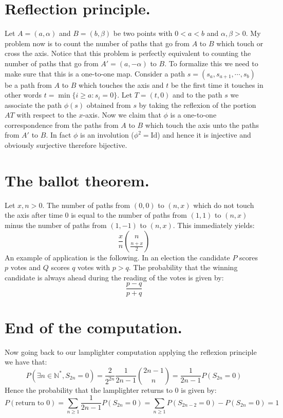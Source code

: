 \documentclass[10pt,a4paper]{book}
\theoremstyle{definition}
\begin{document}
\section{Reflection principle.} Let $A = (a, \alpha)$ and $B = (b, \beta)$ be two points with $0 < a < b$ and $\alpha, \beta > 0$. My problem now is to count the number of paths that go from $A$ to $B$ which touch or cross the axis. Notice that this problem is perfectly equivalent to counting the number of paths that go from $A' = (a, -\alpha)$ to $B$. To formalize this we need to make sure that this is a one-to-one map. Consider a path $s = (s_a, s_{a+1}, \cdots, s_b)$ be a path from $A$ to $B$ which touches the axis and $t$ be the first time it touches in other words $t = \min\{ i \geq a : s_i = 0\}$. Let $T = (t, 0)$ and to the path $s$ we associate the path $\phi(s)$ obtained from $s$ by taking the reflexion of the portion $AT$ with respect to the $x$-axis. Now we claim that $\phi$ is a one-to-one correspondence from the paths from $A$ to $B$ which touch the axis unto the paths from $A'$ to $B$. In fact $\phi$ is an involution ($\phi^2 = \text{Id}$) and hence it is injective and obviously surjective therefore bijective. 

\section{The ballot theorem.} Let $x, n > 0$. The number of paths from $(0,0)$ to $(n, x)$ which do not touch the axis after time $0$ is equal to the number of paths from $(1, 1)$ to $(n,x)$ minus the number of paths from $(1, -1)$ to $(n, x)$. This immediately yields:
\[
\frac{x}{n}\binom{n}{\frac{n+x}{2}}
\]  
An example of application is the following. In an election the candidate $P$ scores $p$ votes and $Q$ scores $q$ votes with $p > q$. The probability that the winning candidate is always ahead during the reading of the votes is given by:
\[
\frac{p - q}{p + q}
\]

\section{End of the computation.}
Now going back to our lamplighter computation applying the reflexion principle we have that:
\[
P(\exists n \in \mathbb{N}^*, S_{2n} = 0) = \frac{2}{2^{2n}} \frac{1}{2n - 1} \binom{2n - 1}{n} = \frac{1}{2n - 1} P(S_{2n} = 0)
\]
Hence the probability that the lamplighter returns to 0 is given by:
\[
P(\text{return to 0}) = \sum_{n \geq 1} \frac{1}{2n -1} P(S_{2n} = 0) = \sum_{n \geq 1} P(S_{2n - 2} = 0 ) - P(S_{2n} = 0) = 1
\]
\end{document}
